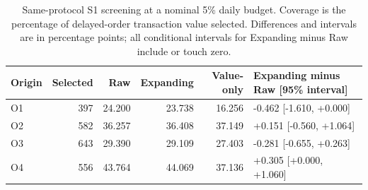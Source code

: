 \begin{table}[t]
\caption{Same-protocol S1 screening at a nominal 5\% daily budget. Coverage is the percentage of delayed-order transaction value selected. Differences and intervals are in percentage points; all conditional intervals for Expanding minus Raw include or touch zero.}
\label{tab:screen}\centering\footnotesize\setlength{\tabcolsep}{7pt}
\begin{tabular}{lrrrrl}\toprule Origin & Selected & Raw & Expanding & Value-only & Expanding minus Raw [95\% interval]\\\midrule
O1 & 397 & 24.200 & 23.738 & 16.256 & -0.462 [-1.610, +0.000] \\
O2 & 582 & 36.257 & 36.408 & 37.149 & +0.151 [-0.560, +1.064] \\
O3 & 643 & 29.390 & 29.109 & 27.403 & -0.281 [-0.655, +0.263] \\
O4 & 556 & 43.764 & 44.069 & 37.136 & +0.305 [+0.000, +1.060] \\
\bottomrule\end{tabular}\end{table}
